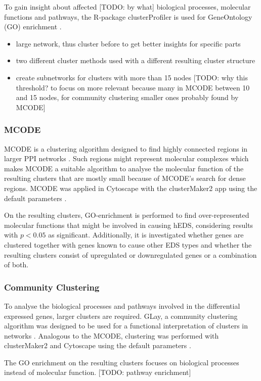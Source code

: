 To gain insight about affected [TODO: by what] biological processes, molecular functions and pathways, the R-package clusterProfiler \cite{Wu2021} is used for GeneOntology (GO) enrichment \cite{Ashburner2000,Consortium2023}.
\begin{itemize}
	\item large network, thus cluster before to get better insights for specific parts
	\item two different cluster methods used with a different resulting cluster structure
	\item create subnetworks for clusters with more than 15 nodes [TODO: why this threshold? to focus on more relevant because many in MCODE between 10 and 15 nodes, for community clustering smaller ones probably found by MCODE]
\end{itemize}

\subsubsection*{MCODE}
MCODE is a clustering algorithm designed to find highly connected regions in larger PPI networks \cite{mcode}. Such regions might represent molecular complexes which makes MCODE a suitable algorithm to analyse the molecular function of the resulting clusters that are mostly small because of MCODE's search for dense regions. MCODE was applied in Cytoscape with the clusterMaker2 app using the default parameters \cite{clusterMaker2}.

On the resulting clusters, GO-enrichment is performed to find over-represented molecular functions that might be involved in causing hEDS, considering results with $p < 0.05$ as significant. Additionally, it is investigated whether genes are clustered together with genes known to cause other EDS types and whether the resulting clusters consist of upregulated or downregulated genes or a combination of both.

\subsubsection*{Community Clustering}
To analyse the biological processes and pathways involved in the differential expressed genes, larger clusters are required. GLay, a community clustering algorithm was designed to be used for a functional interpretation of clusters in networks \cite{GLay}. Analogous to the MCODE, clustering was performed with clusterMaker2 and Cytoscape using the default parameters \cite{Cytoscape, clusterMaker2}.

The GO enrichment on the resulting clusters focuses on biological processes instead of molecular function. [TODO: pathway enrichment]